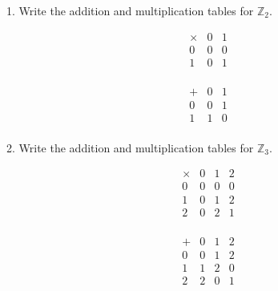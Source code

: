 \documentclass{hippoidC}
\begin{document}
\toc
\thispagestyle{styleTOC}
\pagebreak
\pagestyle{styleE}

\begin{prooflist}{1. Write the addition and multiplication tables for $\mathbb{Z}_2$.}
	\item
	\[
		\begin{array}{c|cc}
			\times & 0 & 1 \\
			\hline
			0      & 0 & 0 \\
			1      & 0 & 1 \\
		\end{array}
	\]
	\item
	\[
		\begin{array}{c|cc}
			+ & 0 & 1 \\
			\hline
			0 & 0 & 1 \\
			1 & 1 & 0 \\
		\end{array}
	\]
\end{prooflist}

\begin{prooflist}{2. Write the addition and multiplication tables for $\mathbb{Z}_3$.}
	\item \[
		\begin{array}{c|ccc}
			\times & 0 & 1 & 2 \\
			\hline
			0      & 0 & 0 & 0 \\
			1      & 0 & 1 & 2 \\
			2      & 0 & 2 & 1 \\
		\end{array}
	\]
	\item \[
		\begin{array}{c|ccc}
			+ & 0 & 1 & 2 \\
			\hline
			0 & 0 & 1 & 2 \\
			1 & 1 & 2 & 0 \\
			2 & 2 & 0 & 1 \\
		\end{array}
	\]
\end{prooflist}
\end{document}
